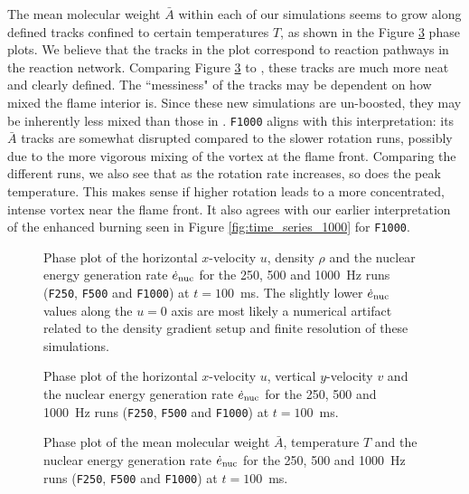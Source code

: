 \documentclass[preprint,times,tighten]{aastex63}
\begin{document}
The mean molecular weight $\bar{A}$ within each of our simulations seems to grow along defined tracks confined to certain temperatures $T$, as shown in the Figure \ref{fig:abar} phase plots. We believe that the tracks in the plot correspond to reaction pathways in the reaction network. Comparing Figure \ref{fig:abar} to \citet{flame_wave1}, these tracks are much more neat and clearly defined. The ``messiness" of the tracks may be dependent on how mixed the flame interior is. Since these new simulations are un-boosted, they may be inherently less mixed than those in \citet{flame_wave1}. {\tt F1000} aligns with this interpretation: its $\bar{A}$ tracks are somewhat disrupted compared to the slower rotation runs, possibly due to the more vigorous mixing of the vortex at the flame front. Comparing the different runs, we also see that as the rotation rate increases, so does the peak temperature. This makes sense if higher rotation leads to a more concentrated, intense vortex near the flame front. It also agrees with our earlier interpretation of the enhanced burning seen in Figure \ref{fig:time_series_1000} for {\tt F1000}. 

\begin{figure}[t]
    \centering
    \caption{\label{fig:urho}Phase plot of the horizontal $x$-velocity $u$, density $\rho$ and the nuclear energy generation rate $\dot{e}_{\rm nuc}$ for the 250, 500 and 1000~Hz runs ({\tt F250}, {\tt F500} and {\tt F1000}) at $t = 100$~ms. The slightly lower $\dot{e}_{\rm nuc}$ values along the $u = 0$ axis are most likely a numerical artifact related to the density gradient setup and finite resolution of these simulations.}
\end{figure}

\begin{figure}[t]
    \centering
    \caption{\label{fig:uv}Phase plot of the horizontal $x$-velocity $u$, vertical $y$-velocity $v$ and the nuclear energy generation rate $\dot{e}_{\rm nuc}$ for the 250, 500 and 1000~Hz runs ({\tt F250}, {\tt F500} and {\tt F1000}) at $t = 100$~ms.}
\end{figure}

\begin{figure}[t]
    \centering
    \caption{\label{fig:abar}Phase plot of the mean molecular weight $\bar{A}$, temperature $T$ and the nuclear energy generation rate $\dot{e}_{\rm nuc}$ for the 250, 500 and 1000~Hz runs ({\tt F250}, {\tt F500} and {\tt F1000}) at $t = 100$~ms.}
\end{figure}
\end{document}
